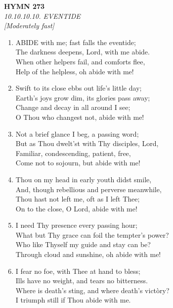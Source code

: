\documentclass[11pt,a4paper]{article}
\begin{document}
\newpage
\begin{center}
    {\Large \textbf{HYMN 273}}
    \\
    \textit{10.10.10.10. EVENTIDE}
    \\
    \textit{\small [Moderately fast]}
\end{center}
\vspace{1em}

\begin{enumerate}
    \item ABIDE with me; fast falls the eventide; \\
        The darkness deepens, Lord, with me abide. \\
        When other helpers fail, and comforts flee, \\
        Help of the helpless, oh abide with me!

    \item Swift to its close ebbs out life's little day; \\
        Earth's joys grow dim, its glories pass away; \\
        Change and decay in all around I see; \\
        O Thou who changest not, abide with me!

    \item Not a brief glance I beg, a passing word; \\
        But as Thou dwelt'st with Thy disciples, Lord, \\
        Familiar, condescending, patient, free, \\
        Come not to sojourn, but abide with me!

    \item Thou on my head in early youth didst smile, \\
        And, though rebellious and perverse meanwhile, \\
        Thou hast not left me, oft as I left Thee; \\
        On to the close, O Lord, abide with me!

    \item I need Thy presence every passing hour; \\
        What but Thy grace can foil the tempter's power? \\
        Who like Thyself my guide and stay can be? \\
        Through cloud and sunshine, oh abide with me!

    \item I fear no foe, with Thee at hand to bless; \\
        Ills have no weight, and tears no bitterness. \\
        Where is death's sting, and where death's vict\`ory? \\
        I triumph still if Thou abide with me.


\end{enumerate}
\end{document}
